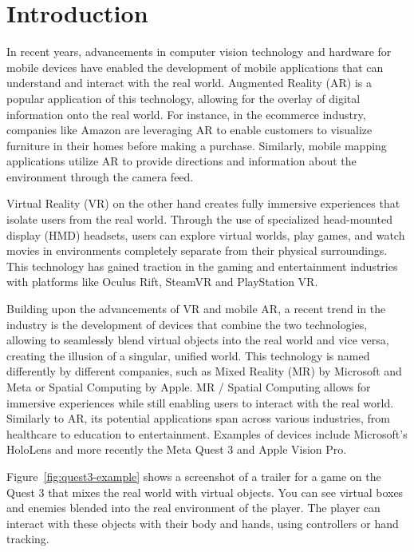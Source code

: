 \chapter{Introduction}
In recent years, advancements in computer vision technology and hardware for mobile devices
have enabled the development of mobile applications that can understand and interact with the real world.
Augmented Reality (AR) is a popular application of this technology,
allowing for the overlay of digital information onto the real world.
For instance, in the ecommerce industry, companies like Amazon are leveraging AR to
enable customers to visualize furniture in their homes before making a purchase.
Similarly, mobile mapping applications utilize AR to provide directions and information about the
environment through the camera feed.

Virtual Reality (VR) on the other hand creates fully immersive experiences
that isolate users from the real world.
Through the use of specialized head-mounted display (HMD) headsets, users can explore virtual worlds,
play games, and watch movies in environments completely separate from their physical surroundings.
This technology has gained traction in the gaming and entertainment industries
with platforms like Oculus Rift, SteamVR and PlayStation VR.

Building upon the advancements of VR and mobile AR,
a recent trend in the industry is the development of devices that combine the two technologies,
allowing to seamlessly blend virtual objects into the real world and vice versa, creating the illusion of a singular, unified world.
This technology is named differently by different companies, such as Mixed Reality (MR) by Microsoft and Meta
or Spatial Computing by Apple.
MR / Spatial Computing allows for immersive experiences while still enabling users to interact with the real world.
Similarly to AR, its potential applications span across various industries, from healthcare to education to entertainment.
Examples of devices include Microsoft's HoloLens and more recently the Meta Quest 3 and Apple Vision Pro.

Figure~\ref{fig:quest3-example} shows a screenshot of a trailer for a game on the Quest 3 that mixes the real world with virtual objects.
You can see virtual boxes and enemies blended into the real environment of the player.
The player can interact with these objects with their body and hands, using controllers or hand tracking.

